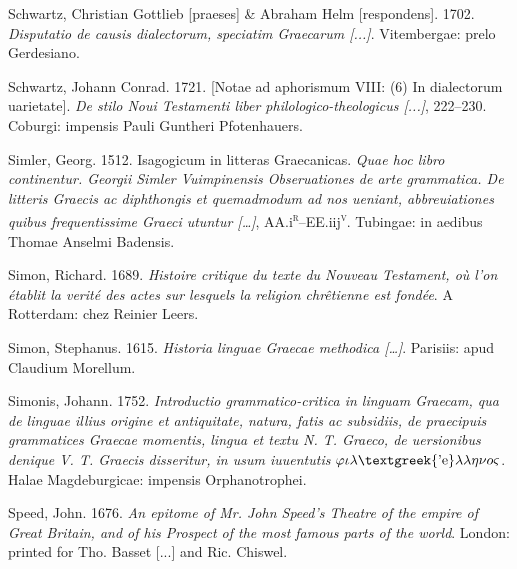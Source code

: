 \begin{styleStandard}
Schwartz, Christian Gottlieb [praeses] \& Abraham Helm [respondens]. 1702. \textit{Disputatio de causis dialectorum, speciatim Graecarum [...]}. Vitembergae: prelo Gerdesiano.
\end{styleStandard}

\begin{styleStandard}
Schwartz, Johann Conrad. 1721. [Notae ad aphorismum VIII: (6) In dialectorum uarietate]. \textit{De stilo Noui Testamenti liber philologico-theologicus [...]}, 222–230. Coburgi: impensis Pauli Guntheri Pfotenhauers.
\end{styleStandard}

\begin{styleStandard}
Simler, Georg. 1512. Isagogicum in litteras Graecanicas. \textit{Quae hoc libro continentur. Georgii Simler Vuimpinensis Obseruationes de arte grammatica. De litteris Graecis ac diphthongis et quemadmodum ad nos ueniant, abbreuiationes quibus frequentissime Graeci utuntur […]}, AA.i\textsc{\textsuperscript{r}}–EE.iij\textsc{\textsuperscript{v}}. Tubingae: in aedibus Thomae Anselmi Badensis.
\end{styleStandard}

\begin{styleStandard}
Simon, Richard. 1689. \textit{Histoire critique du texte du Nouveau Testament, où l’on établit la verité des actes sur lesquels la religion chrêtienne est fondée}. A Rotterdam: chez Reinier Leers.
\end{styleStandard}

\begin{styleStandard}
Simon, Stephanus. 1615. \textit{Historia linguae Graecae methodica […]}. Parisiis: apud Claudium Morellum.
\end{styleStandard}

\begin{styleStandard}
Simonis, Johann. 1752. \textit{Introductio grammatico-critica in linguam Graecam, qua de linguae illius origine et antiquitate, natura, fatis ac subsidiis, de praecipuis grammatices Graecae momentis, lingua et textu N. T. Graeco, de uersionibus denique V. T. Graecis disseritur, in usum iuuentutis $\varphi \iota \lambda \text{\textgreek{'e}}\lambda \lambda \eta \nu o\varsigma $}. Halae Magdeburgicae: impensis Orphanotrophei.
\end{styleStandard}

\begin{styleStandard}
Speed, John. 1676. \textit{An epitome of Mr. John Speed’s Theatre of the empire of Great Britain, and of his Prospect of the most famous parts of the world}. London: printed for Tho. Basset [...] and Ric. Chiswel.
\end{styleStandard}

